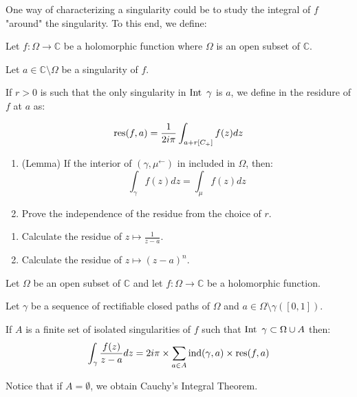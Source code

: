 One way of characterizing a singularity could be to study the integral of $f$ "around" the singularity. To this end, we define:

\begin{defi}
    Let $f: \Omega \rightarrow \mathbb{C}$ be a holomorphic function where $\Omega$ is an open subset of $\mathbb{C}$.

    Let $a\in\mathbb{C}\setminus\Omega$ be a singularity of $f$.

    If $r>0$ is such that the only singularity in $\operatorname{Int}~\gamma$ is $a$, we define in the residure of $f$ at $a$ as:

    $$\operatorname{res}(f, a) = \frac{1}{2i\pi} \int_{a + r[C_+]} f(z)dz$$
\end{defi}

\begin{exo}[$\star$]
    \begin{enumerate}
        \item (Lemma) If the interior of $(\gamma, \mu^\leftarrow)$ in included in $\Omega$, then:
            $$\int_\gamma f(z)dz = \int_\mu f(z)dz$$
        \item Prove the independence of the residue from the choice of $r$.
    \end{enumerate}
\end{exo}

\begin{exo}[$\star$]
    \begin{enumerate}
        \item Calculate the residue of $z \mapsto \frac{1}{z-a}$.
        \item Calculate the residue of $z \mapsto (z-a)^n$.
    \end{enumerate}
\end{exo}

\begin{thm*}
    Let $\Omega$ be an open subset of $\mathbb{C}$ and let $f: \Omega \rightarrow \mathbb{C}$ be a holomorphic function.

    Let $\gamma$ be a sequence of rectifiable closed paths of $\Omega$ and $a\in\Omega\setminus\gamma([0,1])$.

    If $A$ is a finite set of isolated singularities of $f$ such that $\operatorname{Int}~\gamma \subset \Omega \cup A$ then:
    $$\int_\gamma \frac{f(z)}{z-a}dz = 2i\pi \times \sum_{a\in A}\operatorname{ind}(\gamma, a) \times \operatorname{res}(f,a)$$
\end{thm*}

\begin{note}
    Notice that if $A = \emptyset$, we obtain Cauchy's Integral Theorem.
\end{note}

